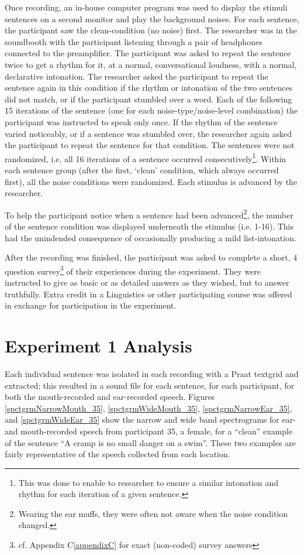 \documentclass[dissertation,copyright]{uathesis}
\begin{document}
Once recording, an in-house computer program was used to display the stimuli sentences on a second monitor and play the background noises.  For each sentence, the participant saw the clean-condition (no noise) first.  The researcher was in the soundbooth with the participant listening through a pair of headphones connected to the preamplifier.  The participant was asked to repeat the sentence twice to get a rhythm for it, at a normal, conversational loudness, with a normal, declarative intonation.  The researcher asked the participant to repeat the sentence again in this condition if the rhythm or intonation of the two sentences did not match, or if the participant stumbled over a word.  Each of the following 15 iterations of the sentence (one for each noise-type/noise-level combination) the participant was instructed to speak only once.  If the rhythm of the sentence varied noticeably, or if a sentence was stumbled over, the researcher again asked the participant to repeat the sentence for that condition.  The sentences were not randomized, i.e. all 16 iterations of a sentence occurred consecutively\footnote{This was done to enable to researcher to ensure a similar intonation and rhythm for each iteration of a given sentence.}. Within each sentence group (after the first, `clean' condition, which always occurred first), all the noise conditions were randomized. Each stimulus is advanced by the researcher.

To help the participant notice when a sentence had been advanced\footnote{Wearing the ear muffs, they were often not aware when the noise condition changed.}, the number of the sentence condition was displayed underneath the stimulus (i.e. 1-16).  This had the unindended consequence of occasionally producing a mild list-intonation. 

After the recording was finished, the participant was asked to complete a short, 4 question survey\footnote{cf. Appendix C\ref{appendixC} for exact (non-coded) survey answers} of their experiences during the experiment.  They were instructed to give as basic or as detailed answers as they wished, but to answer truthfully.  Extra credit in a Linguistics or other participating course was offered in exchange for participation in the experiment.

\section{Experiment 1 Analysis}

Each individual sentence was isolated in each recording with a Praat textgrid and extracted; this resulted in a sound file for each sentence, for each participant, for both the mouth-recorded and ear-recorded speech.  Figures \ref{spctgrmNarrowMouth_35}, \ref{spctgrmWideMouth_35}, \ref{spctgrmNarrowEar_35}, and \ref{spctgrmWideEar_35} show the narrow and wide band spectrograms for ear- and mouth-recorded speech from participant 35, a female, for a ``clean'' example of the sentence ``A cramp is no small danger on a swim''.  These two examples are fairly representative of the speech collected from each location.
\end{document}
